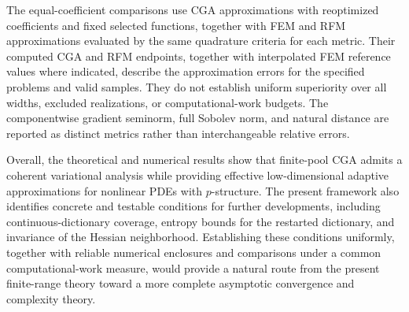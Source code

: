 The equal-coefficient comparisons use CGA approximations with reoptimized
coefficients and fixed selected functions, together with FEM and RFM
approximations evaluated by the same quadrature criteria for each metric.
Their computed CGA and RFM endpoints, together with interpolated FEM reference
values where indicated, describe the approximation errors for the specified problems and valid samples. They do not establish uniform superiority over
all widths, excluded realizations, or computational-work budgets. The
componentwise gradient seminorm, full Sobolev norm, and natural distance are
reported as distinct metrics rather than interchangeable relative errors.

Overall, the theoretical and numerical results show that finite-pool CGA admits a coherent
variational analysis while providing effective low-dimensional adaptive approximations for
nonlinear PDEs with $p$-structure. The present framework also identifies concrete and
testable conditions for further developments, including continuous-dictionary coverage,
entropy bounds for the restarted dictionary, and invariance of the Hessian neighborhood.
Establishing these conditions uniformly, together with reliable numerical enclosures and
comparisons under a common computational-work measure, would provide a natural route from
the present finite-range theory toward a more complete asymptotic convergence and
complexity theory.
